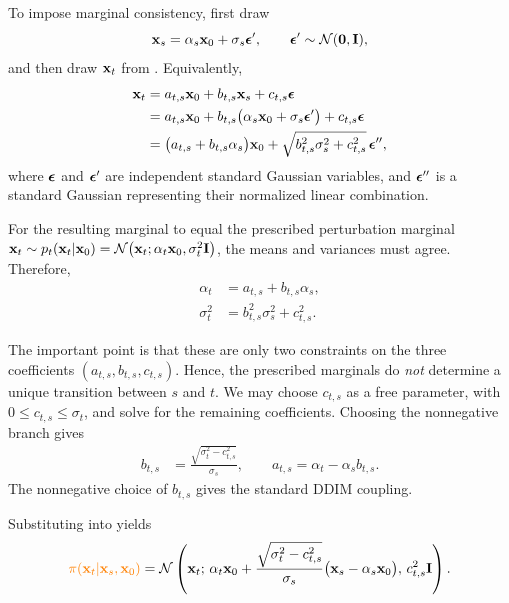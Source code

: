 To impose marginal consistency, first draw
\[
{\mathbf{x}}_s
=
\alpha_s{\mathbf{x}}_0+\sigma_s{\bm{\epsilon}}',
\qquad
{\bm{\epsilon}}'\sim\mathcal{N}(\mathbf{0},\mathbf{I}),
\]
and then draw ${\mathbf{x}}_t$ from
. Equivalently,
\begin{align}
\label{eq:ddim-derivation}
\begin{aligned}
{\mathbf{x}}_t
&=
a_{t,s}{\mathbf{x}}_0
+
b_{t,s}{\mathbf{x}}_s
+
c_{t,s}{\bm{\epsilon}}
\\
&=
a_{t,s}{\mathbf{x}}_0
+
b_{t,s}
\bigl(
\alpha_s{\mathbf{x}}_0+\sigma_s{\bm{\epsilon}}'
\bigr)
+
c_{t,s}{\bm{\epsilon}}
\\
&=
\bigl(
a_{t,s}+b_{t,s}\alpha_s
\bigr){\mathbf{x}}_0
+
\sqrt{
b_{t,s}^2\sigma_s^2+c_{t,s}^2
}\,
{\bm{\epsilon}}'',
\end{aligned}
\end{align}
where ${\bm{\epsilon}}$ and ${\bm{\epsilon}}'$ are independent standard Gaussian variables, and
${\bm{\epsilon}}''$ is a standard Gaussian representing their normalized linear
combination.

For the resulting marginal to equal the prescribed perturbation marginal ${\mathbf{x}}_t
\sim
p_t({\mathbf{x}}_t|{\mathbf{x}}_0)
=
\mathcal{N}
\bigl(
{\mathbf{x}}_t;
\alpha_t{\mathbf{x}}_0,
\sigma_t^2\mathbf{I}
\bigr)$, the means and variances must agree. Therefore,
\begin{align*}
\alpha_t
&=
a_{t,s}+b_{t,s}\alpha_s,
\\
\sigma_t^2
&=
b_{t,s}^2\sigma_s^2+c_{t,s}^2.
\end{align*}

The important point is that these are only two constraints on the three
coefficients $(a_{t,s},b_{t,s},c_{t,s})$. Hence, the prescribed marginals do
\emph{not} determine a unique transition between $s$ and $t$. We may choose
$c_{t,s}$ as a free parameter, with
$0\leq c_{t,s}\leq\sigma_t$, and solve for the remaining coefficients.
Choosing the nonnegative branch gives
\begin{align}
\label{eq:ddim-coefficients}
b_{t,s}
&=
\frac{
\sqrt{\sigma_t^2-c_{t,s}^2}
}{
\sigma_s
},
\qquad
a_{t,s}
=
\alpha_t-\alpha_s b_{t,s}.
\end{align}
The nonnegative choice of $b_{t,s}$ gives the standard DDIM coupling.

Substituting  into
 yields
\begin{align}
\label{eq:ddim-reverse-kernel-result}
{\color{orange}\pi({\mathbf{x}}_t|{\mathbf{x}}_s,{\mathbf{x}}_0)}
=
\mathcal{N}
\left(
{\mathbf{x}}_t;\,
\alpha_t{\mathbf{x}}_0
+
\frac{
\sqrt{\sigma_t^2-c_{t,s}^2}
}{
\sigma_s
}
\bigl(
{\mathbf{x}}_s-\alpha_s{\mathbf{x}}_0
\bigr),
\,
c_{t,s}^2\mathbf{I}
\right).
\end{align}

